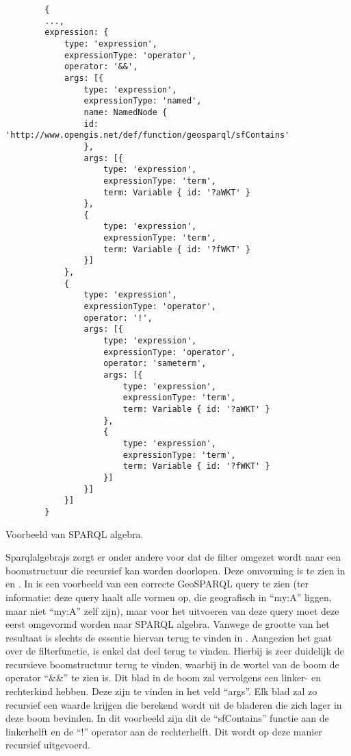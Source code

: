 \begin{listing}[ht]
    \begin{verbatim}
        {
        ...,
        expression: {
            type: 'expression',
            expressionType: 'operator',
            operator: '&&',
            args: [{
                type: 'expression',
                expressionType: 'named',
                name: NamedNode {
                id: 'http://www.opengis.net/def/function/geosparql/sfContains'
                },
                args: [{
                    type: 'expression',
                    expressionType: 'term',
                    term: Variable { id: '?aWKT' }
                },
                {
                    type: 'expression',
                    expressionType: 'term',
                    term: Variable { id: '?fWKT' }
                }]
            },
            {
                type: 'expression',
                expressionType: 'operator',
                operator: '!',
                args: [{
                    type: 'expression',
                    expressionType: 'operator',
                    operator: 'sameterm',
                    args: [{
                        type: 'expression',
                        expressionType: 'term',
                        term: Variable { id: '?aWKT' }
                    },
                    {
                        type: 'expression',
                        expressionType: 'term',
                        term: Variable { id: '?fWKT' }
                    }]
                }]
            }]
        }
    \end{verbatim}
    \caption{Voorbeeld van SPARQL algebra.}
    \label{listing:sparqlalgebrajs_algebra}
\end{listing}

Sparqlalgebrajs zorgt er onder andere voor dat de filter omgezet wordt naar een boomstructuur die recursief kan worden doorlopen. Deze omvorming is te zien in  en . In  is een voorbeeld van een correcte GeoSPARQL query te zien (ter informatie: deze query haalt alle vormen op, die geografisch in ``my:A'' liggen, maar niet ``my:A'' zelf zijn), maar voor het uitvoeren van deze query moet deze eerst omgevormd worden naar SPARQL algebra. Vanwege de grootte van het resultaat is slechts de essentie hiervan terug te vinden in . Aangezien het gaat over de filterfunctie, is enkel dat deel terug te vinden. Hierbij is zeer duidelijk de recursieve boomstructuur terug te vinden, waarbij in de wortel van de boom de operator ``\&\&'' te zien is. Dit blad in de boom zal vervolgens een linker- en rechterkind hebben. Deze zijn te vinden in het veld ``args''. Elk blad zal zo recursief een waarde krijgen die berekend wordt uit de bladeren die zich lager in deze boom bevinden. In dit voorbeeld zijn dit de ``sfContains'' functie aan de linkerhelft en de ``!'' operator aan de rechterhelft. Dit wordt op deze manier recursief uitgevoerd.

